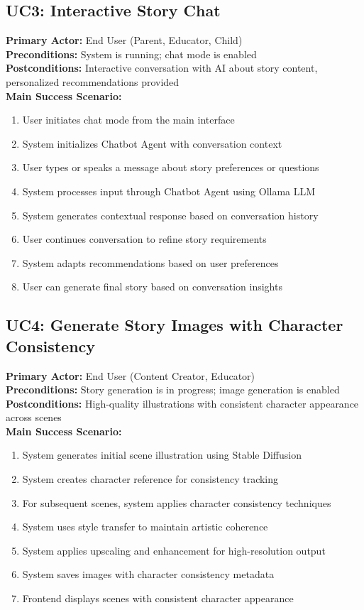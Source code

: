 \subsection{UC3: Interactive Story Chat}
\textbf{Primary Actor:} End User (Parent, Educator, Child)\\
\textbf{Preconditions:} System is running; chat mode is enabled\\
\textbf{Postconditions:} Interactive conversation with AI about story content, personalized recommendations provided\\
\textbf{Main Success Scenario:}
\begin{enumerate}
    \item User initiates chat mode from the main interface
    \item System initializes Chatbot Agent with conversation context
    \item User types or speaks a message about story preferences or questions
    \item System processes input through Chatbot Agent using Ollama LLM
    \item System generates contextual response based on conversation history
    \item User continues conversation to refine story requirements
    \item System adapts recommendations based on user preferences
    \item User can generate final story based on conversation insights
\end{enumerate}

\subsection{UC4: Generate Story Images with Character Consistency}
\textbf{Primary Actor:} End User (Content Creator, Educator)\\
\textbf{Preconditions:} Story generation is in progress; image generation is enabled\\
\textbf{Postconditions:} High-quality illustrations with consistent character appearance across scenes\\
\textbf{Main Success Scenario:}
\begin{enumerate}
    \item System generates initial scene illustration using Stable Diffusion
    \item System creates character reference for consistency tracking
    \item For subsequent scenes, system applies character consistency techniques
    \item System uses style transfer to maintain artistic coherence
    \item System applies upscaling and enhancement for high-resolution output
    \item System saves images with character consistency metadata
    \item Frontend displays scenes with consistent character appearance
\end{enumerate}

